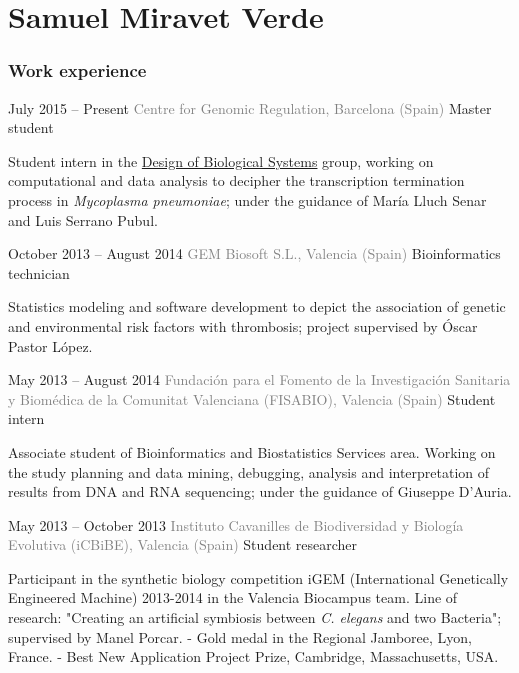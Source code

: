\documentclass{tccv}
\begin{document}
\part{Samuel Miravet Verde}

\section{Work experience}

\begin{eventlist}

\item{July 2015 -- Present}
     {\textcolor{gray}{Centre for Genomic Regulation, Barcelona (Spain)}}
     {Master student}

Student intern in the \href{(http://sb.crg.es/serrano_lab/)}{Design of Biological Systems} group, working on computational and data analysis to decipher the transcription termination process in \textit{Mycoplasma pneumoniae}; under the guidance of María Lluch Senar and Luis Serrano Pubul. 


\item{October 2013 -- August 2014}
     {\textcolor{gray}{GEM Biosoft S.L., Valencia (Spain)}}
     {Bioinformatics technician}

Statistics modeling and software development to depict the association of genetic and environmental risk factors with thrombosis; project supervised by Óscar Pastor López.

\item{May 2013 -- August 2014}
     {\textcolor{gray}{Fundación para el Fomento de la Investigación \newline Sanitaria y Biomédica de la Comunitat Valenciana (FISABIO), Valencia (Spain)}}
     {Student intern}

Associate student of Bioinformatics and Biostatistics Services area. Working on the study planning and data mining, debugging, analysis and interpretation of results from DNA and RNA sequencing; under the guidance of Giuseppe D’Auria.

\item{May 2013 -- October 2013}
{\textcolor{gray}{Instituto Cavanilles de Biodiversidad y Biología Evolutiva (iCBiBE), Valencia (Spain)}}
{Student researcher}

Participant in the synthetic biology competition iGEM (International Genetically Engineered Machine) 2013-2014 in the Valencia Biocampus team. Line of research: "Creating an artificial symbiosis between \textit{C. elegans} and two Bacteria"; supervised by Manel Porcar.\newline
- Gold medal in the Regional Jamboree, Lyon, France.
- Best New Application Project Prize, Cambridge, Massachusetts, USA.



\end{eventlist}
\end{document}
